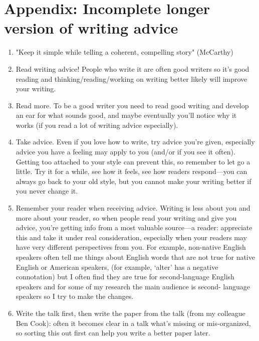 \documentclass[11pt,letter]{article}
\begin{document}
\section{Appendix: Incomplete longer version of writing advice}
\begin{enumerate}
\item "Keep it simple while telling a coherent, compelling story" (McCarthy)
\item Read writing advice! People who write it are often good writers so it’s good reading and thinking/reading/working on writing better likely will improve your writing.
\item Read more. To be a good writer you need to read good writing and develop an ear for what sounds good, and maybe eventually you’ll notice why it works (if you read a lot of writing advice especially). 
\item Take advice. Even if you love how to write, try advice you’re given, especially advice you have a feeling may apply to you (and/or if you see it often). Getting too attached to your style can prevent this, so remember to let go a little. Try it for a while, see how it feels, see how readers respond—you can always go back to your old style, but you cannot make your writing better if you never change it. 
\item Remember your reader when receiving advice. Writing is less about you and more about your reader, so when people read your writing and give you advice, you’re getting info from a most valuable source—a reader: appreciate this and take it under real consideration, especially when your readers may have very different perspectives from you. For example, non-native English speakers often tell me things about English words that are not true for native English or American speakers, (for example, ‘alter’ has a negative connotation) but I often find they are true for second-language English speakers and for some of my research the main audience is second- language speakers so I try to make the changes. 
\item Write the talk first, then write the paper from the talk (from my colleague Ben Cook): often it becomes clear in a talk what’s missing or mis-organized, so sorting this out first can help you write a better paper later. 
\end{enumerate}
\end{document}
